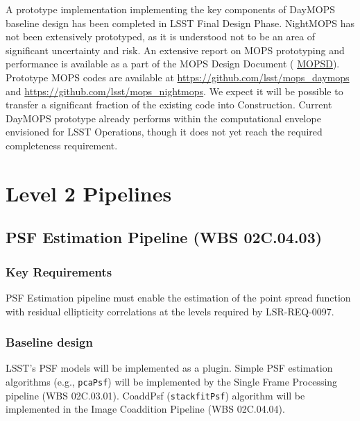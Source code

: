 \documentclass[12pt]{article}
\newcommand{\ds}[2]{{\color{blue} \href{https://docushare.lsstcorp.org/docushare/dsweb/Get/#1}{#2}}\xspace}
\newcommand{\MOPSD}{\ds{LDM-156}{MOPSD}}
\newcommand{\wbsSFM}{WBS 02C.03.01}
\newcommand{\wbsPSF}{WBS 02C.04.03}
\newcommand{\wbsCoadd}{WBS 02C.04.04}
\begin{document}
A prototype implementation implementing the key components of DayMOPS baseline design has been completed in LSST Final Design Phase. NightMOPS has not been extensively prototyped, as it is understood not to be an area of significant uncertainty and risk. An extensive report on MOPS prototyping and performance is available as a part of the MOPS Design Document (\MOPSD).
\\

Prototype MOPS codes are available at \url{https://github.com/lsst/mops_daymops} and \url{https://github.com/lsst/mops_nightmops}. We expect it will be possible to transfer a significant fraction of the existing code into Construction. Current DayMOPS prototype already performs within the computational envelope envisioned for LSST Operations, though it does not yet reach the required completeness requirement.

\clearpage

\section{Level 2 Pipelines}

\subsection{PSF Estimation Pipeline (\wbsPSF)}

\subsubsection{Key Requirements}

PSF Estimation pipeline must enable the estimation of the point spread function with residual ellipticity correlations at the levels required by LSR-REQ-0097.

\subsubsection{Baseline design}

LSST's PSF models will be implemented as a plugin. Simple PSF estimation algorithms (e.g., {\tt pcaPsf}) will be implemented by the Single Frame Processing pipeline (\wbsSFM). CoaddPsf ({\tt stackfitPsf}) algorithm will be implemented in the Image Coaddition Pipeline (\wbsCoadd).
\\
\end{document}
